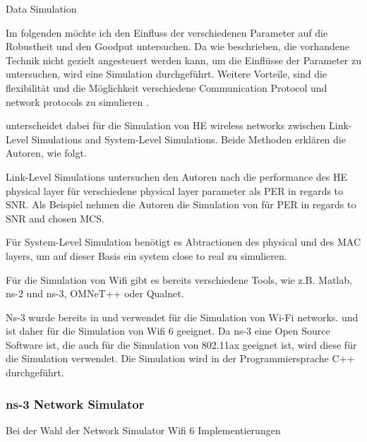 \documentclass[]{nsm-thesis}
\begin{document}
 
 Data Simulation
 
 
 

Im folgenden möchte ich den Einfluss der verschiedenen Parameter auf die Robustheit und den Goodput untersuchen. Da wie beschrieben, die vorhandene Technik nicht
gezielt angesteuert werden kann, um die Einflüsse der Parameter zu untersuchen, wird eine Simulation durchgeführt. Weitere Vorteile, sind die flexibilität und die
Möglichkeit verschiedene Communication Protocol und network protocols zu simulieren \cite{ComparativeStudyKumar}.

\textcite{OmarHESurvey} unterscheidet dabei für die Simulation von HE wireless networks zwischen Link-Level Simulations and System-Level Simulations. Beide Methoden erklären die Autoren, wie folgt.

Link-Level Simulations untersuchen den Autoren nach die performance des HE physical layer für verschiedene physical layer parameter als \ac{PER} in regards to \ac{SNR}. Als Beispiel nehmen die Autoren die Simulation von \textcite{201} für PER in regards to SNR and chosen MCS.

Für System-Level Simulation benötigt es Abtractionen des physical und des MAC layers, um auf dieser Basis ein system close to real zu simulieren.

Für die Simulation von Wifi gibt es bereits verschiedene Tools, wie z.B. Matlab, ns-2 und ns-3, OMNeT++ oder Qualnet.

\cite{SimulationWifiMesh}
Ns-3 wurde bereits in \cite{ComparativeStudyKumar} und \cite{SimulationWifiMesh} verwendet für die Simulation von Wi-Fi networks. \textcite{} und ist daher für die Simulation von Wifi 6 geeignet.
Da ns-3 eine Open Source Software ist, die auch für die
Simulation von 802.11ax geeignet ist, wird diese für die Simulation verwendet. Die Simulation wird in der Programmiersprache C++ durchgeführt.


 
\subsubsection*{ns-3 Network Simulator}

Bei der Wahl der Network Simulator Wifi 6 Implementierungen 


\end{document}
